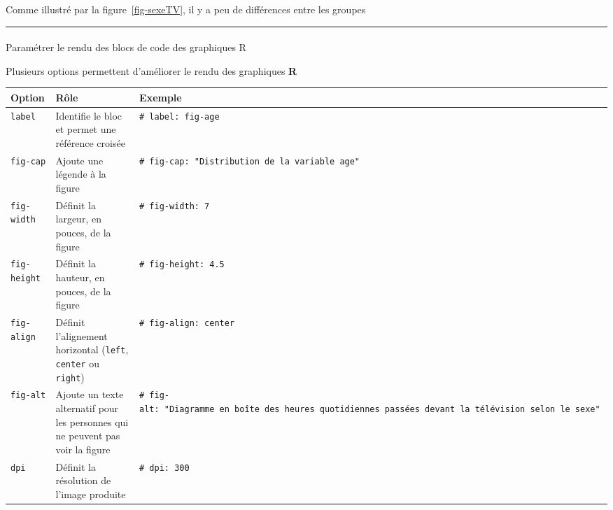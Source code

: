 \documentclass[
  french,
  10pt,
  a4paper,
]{article}
\makeatletter
\let\oldparagraph\paragraph
\renewcommand{\paragraph}{
    \@ifstar
      \xxxParagraphStar
      \xxxParagraphNoStar
  }
\newcommand{\xxxParagraphStar}[1]{\oldparagraph*{#1}\mbox{}}
\newcommand{\xxxParagraphNoStar}[1]{\oldparagraph{#1}\mbox{}}
\newcounter{none} %
\makeatother
\begin{document}
Comme illustré par la figure~\ref{fig-sexeTV}, il y a peu de différences
entre les groupes

\begin{center}\rule{0.5\linewidth}{0.5pt}\end{center}

\paragraph{Paramétrer le rendu des blocs de code des graphiques
R}\label{paramuxe9trer-le-rendu-des-blocs-de-code-des-graphiques-r}

Plusieurs options permettent d'améliorer le rendu des graphiques
\textbf{R}

{\def\LTcaptype{none} %
\begin{longtable}[]{@{}
  >{\raggedright\arraybackslash}p{}
  >{\raggedright\arraybackslash}p{}
  >{\raggedright\arraybackslash}p{}@{}}
\toprule\noalign{}
\begin{minipage}[b]{\linewidth}\raggedright
Option
\end{minipage} & \begin{minipage}[b]{\linewidth}\raggedright
Rôle
\end{minipage} & \begin{minipage}[b]{\linewidth}\raggedright
Exemple
\end{minipage} \\
\midrule\noalign{}
\endhead
\bottomrule\noalign{}
\endlastfoot
\texttt{label} & Identifie le bloc et permet une référence croisée &
\texttt{\#\textbar{}\ label:\ fig-age} \\
\texttt{fig-cap} & Ajoute une légende à la figure &
\texttt{\#\textbar{}\ fig-cap:\ "Distribution\ de\ la\ variable\ \textquotesingle{}age\textquotesingle{}"} \\
\texttt{fig-width} & Définit la largeur, en pouces, de la figure &
\texttt{\#\textbar{}\ fig-width:\ 7} \\
\texttt{fig-height} & Définit la hauteur, en pouces, de la figure &
\texttt{\#\textbar{}\ fig-height:\ 4.5} \\
\texttt{fig-align} & Définit l'alignement horizontal (\texttt{left},
\texttt{center} ou \texttt{right}) &
\texttt{\#\textbar{}\ fig-align:\ center} \\
\texttt{fig-alt} & Ajoute un texte alternatif pour les personnes qui ne
peuvent pas voir la figure &
\texttt{\#\textbar{}\ fig-alt:\ "Diagramme\ en\ boîte\ des\ heures\ quotidiennes\ passées\ devant\ la\ télévision\ selon\ le\ sexe"} \\
\texttt{dpi} & Définit la résolution de l'image produite &
\texttt{\#\textbar{}\ dpi:\ 300} \\
\end{longtable}
}
\end{document}
